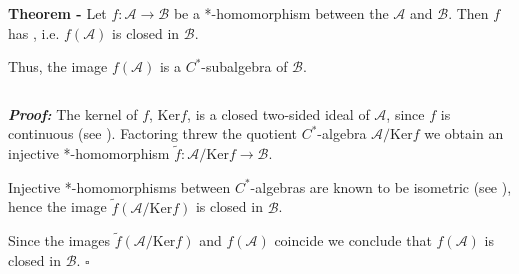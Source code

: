 \documentclass[12pt]{article}
\begin{document}

{\bf Theorem -} Let $f: \mathcal{A} \longrightarrow \mathcal{B}$ be a *-homomorphism between the  $\mathcal{A}$ and $\mathcal{B}$. Then $f$ has  , i.e. $f(\mathcal{A})$ is closed in $\mathcal{B}$.

Thus, the image $f(\mathcal{A})$ is a $C^*$-subalgebra of $\mathcal{B}$.

$\,$

{\bf \emph{Proof:}} The kernel of $f$, $\mathrm{Ker} f$, is a closed two-sided ideal of $\mathcal{A}$, since $f$ is continuous (see ). Factoring threw the quotient $C^*$-algebra $\mathcal{A}/\mathrm{Ker} f$ we obtain an injective *-homomorphism $\widetilde{f}:\mathcal{A}/\mathrm{Ker} f \longrightarrow \mathcal{B}$.

Injective *-homomorphisms between $C^*$-algebras are known to be isometric (see ), hence the image $\widetilde{f}(\mathcal{A}/\mathrm{Ker} f)$ is closed in $\mathcal{B}$.

Since the images $\widetilde{f}(\mathcal{A}/\mathrm{Ker} f)$ and $f(\mathcal{A})$ coincide we conclude that $f(\mathcal{A})$ is closed in $\mathcal{B}$. $\square$
\end{document}
